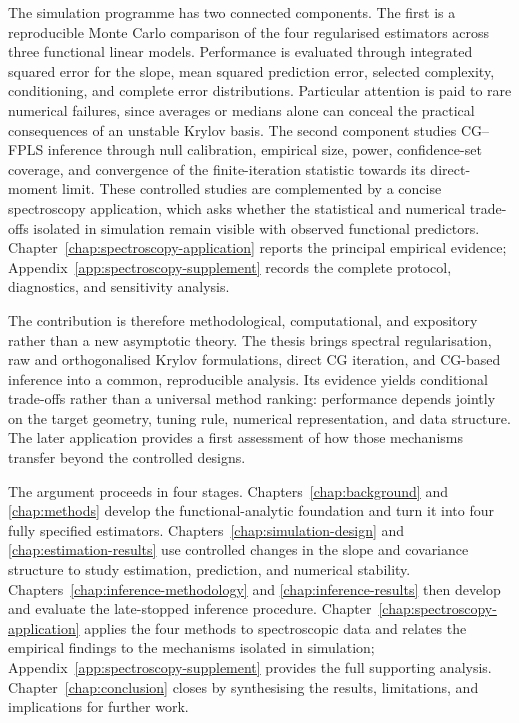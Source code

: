 The simulation programme has two connected components. The first is a reproducible Monte Carlo comparison of the four regularised estimators across three functional linear models. Performance is evaluated through integrated squared error for the slope, mean squared prediction error, selected complexity, conditioning, and complete error distributions. Particular attention is paid to rare numerical failures, since averages or medians alone can conceal the practical consequences of an unstable Krylov basis. The second component studies CG--FPLS inference through null calibration, empirical size, power, confidence-set coverage, and convergence of the finite-iteration statistic towards its direct-moment limit. These controlled studies are complemented by a concise spectroscopy application, which asks whether the statistical and numerical trade-offs isolated in simulation remain visible with observed functional predictors. Chapter~\ref{chap:spectroscopy-application} reports the principal empirical evidence; Appendix~\ref{app:spectroscopy-supplement} records the complete protocol, diagnostics, and sensitivity analysis.

The contribution is therefore methodological, computational, and expository rather than a new asymptotic theory. The thesis brings spectral regularisation, raw and orthogonalised Krylov formulations, direct CG iteration, and CG-based inference into a common, reproducible analysis. Its evidence yields conditional trade-offs rather than a universal method ranking: performance depends jointly on the target geometry, tuning rule, numerical representation, and data structure. The later application provides a first assessment of how those mechanisms transfer beyond the controlled designs.

The argument proceeds in four stages. Chapters~\ref{chap:background} and
\ref{chap:methods} develop the functional-analytic foundation and turn it into
four fully specified estimators. Chapters~\ref{chap:simulation-design} and
\ref{chap:estimation-results} use controlled changes in the slope and covariance
structure to study estimation, prediction, and numerical stability.
Chapters~\ref{chap:inference-methodology} and \ref{chap:inference-results}
then develop and evaluate the late-stopped inference procedure.
Chapter~\ref{chap:spectroscopy-application} applies the four methods to
spectroscopic data and relates the empirical findings to the mechanisms
isolated in simulation; Appendix~\ref{app:spectroscopy-supplement} provides
the full supporting analysis. Chapter~\ref{chap:conclusion} closes by
synthesising the results, limitations, and implications for further work.
